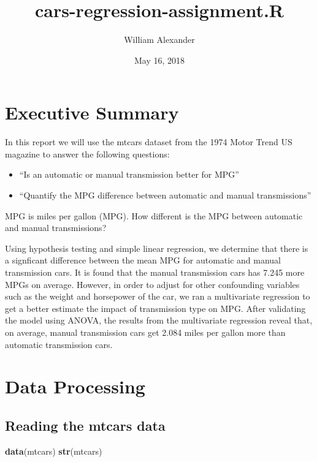 \documentclass[]{article}
\title{cars-regression-assignment.R}
\author{William Alexander}
\date{May 16, 2018}
\newenvironment{Shaded}{\begin{snugshade}}{\end{snugshade}}
\newcommand{\KeywordTok}[1]{\textcolor[rgb]{0.13,0.29,0.53}{\textbf{#1}}}
\newcommand{\NormalTok}[1]{#1}
\providecommand{\tightlist}{%
  \setlength{\itemsep}{0pt}\setlength{\parskip}{0pt}}
\begin{document}
\maketitle

\section{Executive Summary}\label{executive-summary}

In this report we will use the mtcars dataset from the 1974 Motor Trend
US magazine to answer the following questions:

\begin{itemize}
\tightlist
\item
  ``Is an automatic or manual transmission better for MPG''
\item
  ``Quantify the MPG difference between automatic and manual
  transmissions''
\end{itemize}

MPG is miles per gallon (MPG). How different is the MPG between
automatic and manual transmissions?

Using hypothesis testing and simple linear regression, we determine that
there is a signficant difference between the mean MPG for automatic and
manual transmission cars. It is found that the manual transmission cars
has 7.245 more MPGs on average. However, in order to adjust for other
confounding variables such as the weight and horsepower of the car, we
ran a multivariate regression to get a better estimate the impact of
transmission type on MPG. After validating the model using ANOVA, the
results from the multivariate regression reveal that, on average, manual
transmission cars get 2.084 miles per gallon more than automatic
transmission cars.

\section{Data Processing}\label{data-processing}

\subsection{Reading the mtcars data}\label{reading-the-mtcars-data}

\begin{Shaded}
\begin{Highlighting}[]
\KeywordTok{data}\NormalTok{(mtcars)}
\KeywordTok{str}\NormalTok{(mtcars)}
\end{Highlighting}
\end{Shaded}
\end{document}

